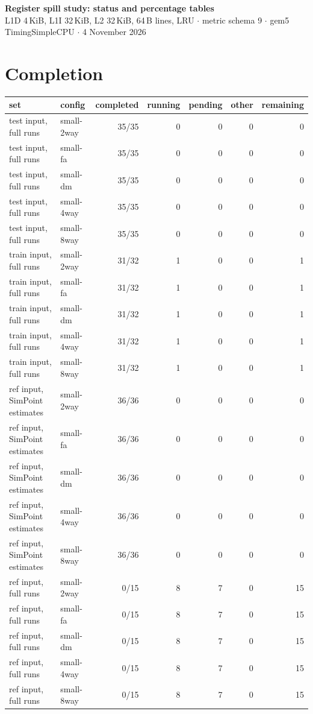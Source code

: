 \documentclass[10pt,a4paper,landscape]{article}
\begin{document}
\begin{center}
{\large\bfseries Register spill study: status and percentage tables}\\[3pt]
{\small L1D 4\,KiB, L1I 32\,KiB, L2 32\,KiB, 64\,B lines, LRU $\cdot$ metric schema 9 $\cdot$ gem5 TimingSimpleCPU $\cdot$ 4 November 2026}
\end{center}
\section*{Completion}
{\small
\begin{longtable}{llrrrrr}
\toprule
set & config & completed & running & pending & other & remaining \\
\midrule
\endhead
\bottomrule
\endfoot
test input, full runs & small-2way & 35/35 & 0 & 0 & 0 & 0 \\
test input, full runs & small-fa & 35/35 & 0 & 0 & 0 & 0 \\
test input, full runs & small-dm & 35/35 & 0 & 0 & 0 & 0 \\
test input, full runs & small-4way & 35/35 & 0 & 0 & 0 & 0 \\
test input, full runs & small-8way & 35/35 & 0 & 0 & 0 & 0 \\
train input, full runs & small-2way & 31/32 & 1 & 0 & 0 & 1 \\
train input, full runs & small-fa & 31/32 & 1 & 0 & 0 & 1 \\
train input, full runs & small-dm & 31/32 & 1 & 0 & 0 & 1 \\
train input, full runs & small-4way & 31/32 & 1 & 0 & 0 & 1 \\
train input, full runs & small-8way & 31/32 & 1 & 0 & 0 & 1 \\
ref input, SimPoint estimates & small-2way & 36/36 & 0 & 0 & 0 & 0 \\
ref input, SimPoint estimates & small-fa & 36/36 & 0 & 0 & 0 & 0 \\
ref input, SimPoint estimates & small-dm & 36/36 & 0 & 0 & 0 & 0 \\
ref input, SimPoint estimates & small-4way & 36/36 & 0 & 0 & 0 & 0 \\
ref input, SimPoint estimates & small-8way & 36/36 & 0 & 0 & 0 & 0 \\
ref input, full runs & small-2way & 0/15 & 8 & 7 & 0 & 15 \\
ref input, full runs & small-fa & 0/15 & 8 & 7 & 0 & 15 \\
ref input, full runs & small-dm & 0/15 & 8 & 7 & 0 & 15 \\
ref input, full runs & small-4way & 0/15 & 8 & 7 & 0 & 15 \\
ref input, full runs & small-8way & 0/15 & 8 & 7 & 0 & 15 \\
\end{longtable}
}
\clearpage
\end{document}
